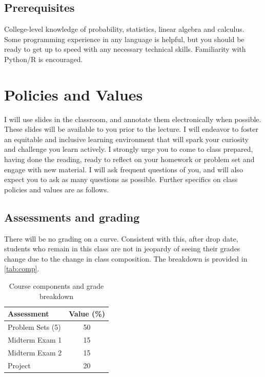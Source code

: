\documentclass[11pt,twoside]{article}
\numberwithin{equation}{section}
\newcommand{\?}{\stackrel{?}{=}}
\begin{document}
\subsection{Prerequisites}
College-level knowledge of probability, statistics, linear algebra and calculus.
Some programming experience in any language is helpful, but you should be ready to get up to speed with any necessary technical skills.
Familiarity with Python/R is encouraged.

\section{Policies and Values}
I will use slides in the classroom, and annotate them electronically when possible.  These slides will be available to
you prior to the lecture.  I will endeavor to foster an equitable and inclusive learning environment that will spark
your curiosity and challenge you learn actively.  I strongly urge you to come to class prepared, having done the
reading, ready to reflect on your homework or problem set and engage with new material.  I will ask frequent questions
of you, and will also expect you to ask as many questions as possible.  Further specifics on class policies and values
are as follows.

\subsection{Assessments and grading}
There will be no grading on a curve.
Consistent with this, after drop date, students who remain in this class are not in jeopardy of seeing their grades change due to the change in class composition.
The breakdown is provided in \autoref{tab:comp}.

\begin{table}[h!]
  \centering
    \caption{Course components and grade breakdown}
  \label{tab:comp}
  \begin{tabular}{l   c}\toprule
    \bf Assessment   & \bf Value (\%) \\ \midrule
    Problem Sets (5)   &   50\\
    Midterm Exam 1      &   15 \\
    Midterm Exam 2      & 15 \\
    Project     &   20 \\ \bottomrule
  \end{tabular}
\end{table}


\eject
\end{document}
